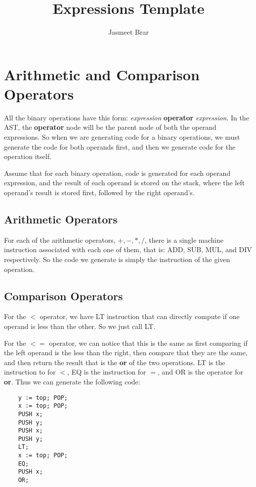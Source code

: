 \documentclass{article}
\begin{document}
	\title{Expressions Template}
	\author{Jasmeet Brar}
    \maketitle


\section{Arithmetic and Comparison Operators}

All the binary operations have this form: \textit{expression} \textbf{operator} \textit{expression}. In the AST, the \textbf{operator} node will be the parent node of both the operand expressions. So when we are generating code for a binary operations, we must generate the code for both operands first, and then we generate code for the operation itself.

Assume that for each binary operation, code is generated for each operand expression, and the result of each operand is stored on the stack, where the left operand's result is stored first, followed by the right operand's.

\subsection{Arithmetic Operators}

For each of the arithmetic operators, $+,-,*,/$, there is a single machine instruction associated with each one of them, that is: ADD, SUB, MUL, and DIV respectively. So the code we generate is simply the instruction of the given operation.

\subsection{Comparison Operators}

For the $<$ operator, we have LT instruction that can directly compute if one operand is less than the other. So we just call LT.

For the $<=$ operator, we can notice that this is the same as first comparing if the left operand is the less than the right, then compare that they are the same, and then return the result that is the \textbf{or} of the two operations. LT is the instruction to for $<$, EQ is the instruction for $=$, and OR is the operator for \textbf{or}. Thus we can generate the following code:

\begin{lstlisting}
    y := top; POP;
    x := top; POP;
    PUSH x;
    PUSH y;
    PUSH x;
    PUSH y;
    LT;
    x := top; POP;
    EQ;
    PUSH x;
    OR;
\end{lstlisting}
\end{document}
